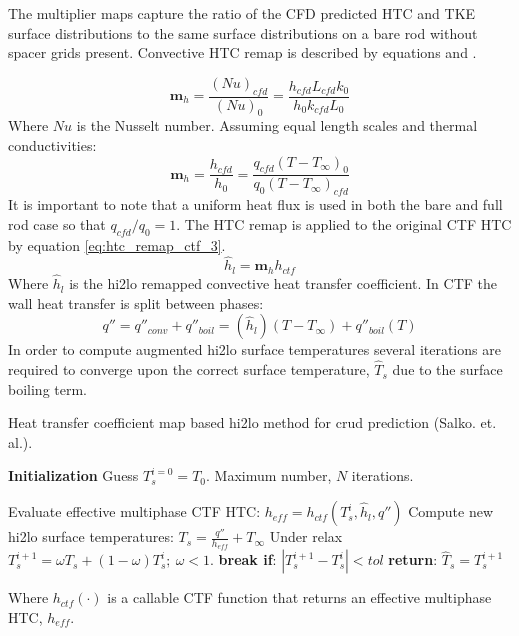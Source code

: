     The multiplier maps capture the ratio of the CFD predicted HTC and TKE surface distributions to the same surface distributions on a bare rod without spacer grids present.
    Convective HTC remap is described by equations \label{eq:htc_remap_ctf_1} and \label{eq:htc_remap_ctf_2}.
    
    \begin{equation}
        \mathbf m_h = \frac{(Nu)_{cfd}}{(Nu)_{0}} = \frac{h_{cfd} L_{cfd} k_{0} }{h_{0}k_{cfd} L_{0}}
         \label{eq:htc_remap_ctf_1}
    \end{equation}
    Where $Nu$ is the Nusselt number.  Assuming equal length scales and thermal conductivities:
    \begin{equation}
        \mathbf m_h = \frac{h_{cfd}}{h_{0}} = \frac{q_{cfd}(T-T_\infty)_{0}}{q_{0}(T-T_\infty)_{cfd}}
        \label{eq:htc_remap_ctf_2}
    \end{equation}
    It is important to note that a uniform heat flux is used in both the bare and full rod case so that $q_{cfd}/q_0 =1 $.
    The HTC remap is applied to the original CTF HTC by equation \ref{eq:htc_remap_ctf_3}.
    \begin{equation}
        \hat h_{l} = \mathbf m_h h_{ctf}
        \label{eq:htc_remap_ctf_3}
    \end{equation}
    Where $\hat h_l$ is the hi2lo remapped convective heat transfer coefficient.  In CTF the wall heat transfer is split between phases:
    \begin{equation}
        q'' = q''_{conv} + q''_{boil} = (\hat h_l)(T-T_{\infty}) + q''_{boil}(T)
    \end{equation}
    In order to compute augmented hi2lo surface temperatures
    several iterations are required to converge upon the correct surface temperature, $\hat T_s$ due to the surface boiling term.

    \begin{algorithm}[H]
        \caption{Heat transfer coefficient map based hi2lo method for crud prediction (Salko. et. al.).}
    \begin{algorithmic}[1]
    \STATE \textbf{Initialization} 
    \STATE Guess $T^{i=0}_s=T_0$.  Maximum number, $N$ iterations.

           \STATE Evaluate effective multiphase CTF HTC: $h_{eff} = h_{{ctf}}(T^i_{s}, \hat h_l, q'')$ \;
           \STATE Compute new hi2lo surface temperatures: $T_{s} = \frac{q''}{h_{eff}} + T_\infty$ \;
           \STATE  Under relax  $T^{i+1}_{s} = \omega T_{s} + (1 - \omega) T^{i}_{s} ;\ \omega < 1.$ \;
           \STATE  \textbf{break if}:  $|T^{i+1}_s - T^i_s| < tol$ \;
        \ENDFOR 
    \STATE \textbf{return}: $\hat T_s = T^{i+1}_s$
    \end{algorithmic}
    \end{algorithm}
    Where $h_{ctf}(\cdot)$ is a callable CTF function that returns an effective multiphase HTC, $h_{eff}$.

